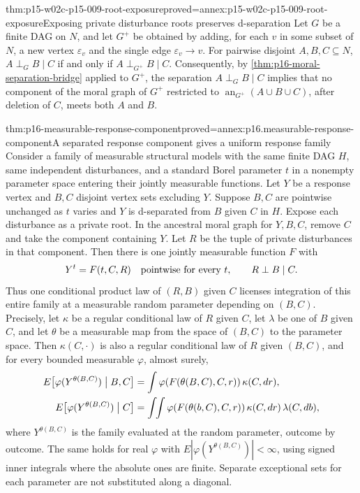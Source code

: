 \begin{hblemma}{thm:p15-w02c-p15-009-root-exposure}{proved=annex:p15-w02c-p15-009-root-exposure}{Exposing private disturbance roots preserves d-separation}
Let \(G\) be a finite DAG on \(N\), and let \(G^+\) be obtained by adding,
for each \(v\) in some subset of \(N\), a new vertex \(\varepsilon_v\) and
the single edge \(\varepsilon_v\to v\). For pairwise disjoint
\(A,B,C\subseteq N\),
\(A\mathrel{\perp_G}B\mid C\) if and only if
\(A\mathrel{\perp_{G^+}}B\mid C\). Consequently, by
\cref{thm:p16-moral-separation-bridge} applied to \(G^+\), the separation
\(A\mathrel{\perp_G}B\mid C\) implies that no component of the moral
graph of \(G^+\) restricted to
\(\operatorname{an}_{G^+}(A\cup B\cup C)\), after deletion of \(C\),
meets both \(A\) and \(B\).
\end{hblemma}

\begin{hblemma}{thm:p16-measurable-response-component}{proved=annex:p16.measurable-response-component}{A separated response component gives a uniform response family}
Consider a family of measurable structural models with the same finite
DAG \(H\), same independent disturbances, and a standard Borel parameter
\(t\) in a nonempty parameter space entering their jointly measurable functions.
Let \(Y\) be a response vertex and \(B,C\) disjoint vertex sets excluding
\(Y\). Suppose \(B,C\) are pointwise unchanged as \(t\) varies and \(Y\) is d-separated
from \(B\) given \(C\) in \(H\). Expose each disturbance as a private
root. In the ancestral moral graph for \(Y,B,C\), remove \(C\) and
take the component containing \(Y\). Let \(R\) be the tuple of private
disturbances in that component. Then there is one jointly measurable
function \(F\) with
\[
 Y^t=F(t,C,R)\quad\hbox{pointwise for every }t,
 \qquad R\perp B\mid C.
\]
Thus one conditional product law of \((R,B)\) given \(C\) licenses
integration of this entire family at a measurable random parameter
depending on \((B,C)\). Precisely, let \(\kappa\) be a regular
conditional law of \(R\) given \(C\), let \(\lambda\) be one of \(B\)
given \(C\), and let \(\theta\) be a measurable map from the space of
\((B,C)\) to the parameter space. Then \(\kappa(C,\cdot)\) is also a
regular conditional law of \(R\) given \((B,C)\), and for every bounded
measurable \(\varphi\), almost surely,
\[
\begin{aligned}
 E\bigl[\varphi(Y^{\theta(B,C)})\bigm|B,C\bigr]
   &=\int\varphi(F(\theta(B,C),C,r))\,\kappa(C,dr),\\
 E\bigl[\varphi(Y^{\theta(B,C)})\bigm|C\bigr]
   &=\int\!\!\int\varphi(F(\theta(b,C),C,r))\,
                  \kappa(C,dr)\,\lambda(C,db),
\end{aligned}
\]
where \(Y^{\theta(B,C)}\) is the family evaluated at the random
parameter, outcome by outcome. The same holds for real \(\varphi\) with
\(E|\varphi(Y^{\theta(B,C)})|<\infty\), using signed inner integrals
where the absolute ones are finite. Separate exceptional sets for each
parameter are not substituted along a diagonal.
\end{hblemma}

